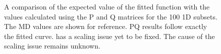 \documentclass[12pt]{report}
\begin{document}
\begin{figure}[ht!]
 \centering
 
 \quad
 \caption[Comparison of the PQ matrices with the expected result for \textlangle{}100\textrangle{} 1D subset.]{\label{appfig:100PQ} A comparison of the expected value of the fitted function with the values calculated using the P and Q matrices for the \textlangle{}100\textrangle{} 1D subsets.  The MD values are shown for reference.  \protect{} PQ results follow exactly the fitted curve.  \protect{} has a scaling issue yet to be fixed.  The cause of the scaling issue remains unknown.}
\end{figure}
\end{document}
